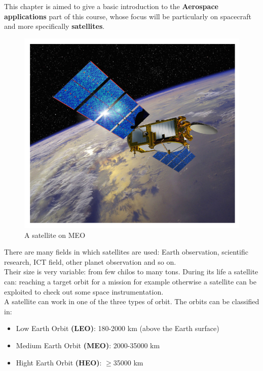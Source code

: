 This chapter is aimed to give a basic introduction to the \textbf{Aerospace applications} part of this course, whose focus will be particularly on spacecraft and more specifically \textbf{satellites}.

\begin{figure}[h]
    \centering
    \includegraphics[scale=0.7]{AerospaceApplications/images/satellite_img.png}
    \caption{A satellite on MEO}
\end{figure}

There are many fields in which satellites are used: Earth observation, scientific research, ICT field, other planet observation and so on.\\
Their size is very variable: from few chilos to many tons. During its life a satellite can: reaching a target orbit for a mission for example otherwise a satellite can be exploited to check out some space instrumentation.\\

A satellite can work in one of the three types of orbit. The orbits can be classified in: 
\begin{itemize}
    \itemsep0em
    \item Low Earth Orbit \textbf{(LEO)}: 180-2000 km (above the Earth surface)
    \item Medium Earth Orbit \textbf{(MEO)}: 2000-35000 km
    \item Hight Earth Orbit \textbf{(HEO)}: $\ge$35000 km
\end{itemize}

